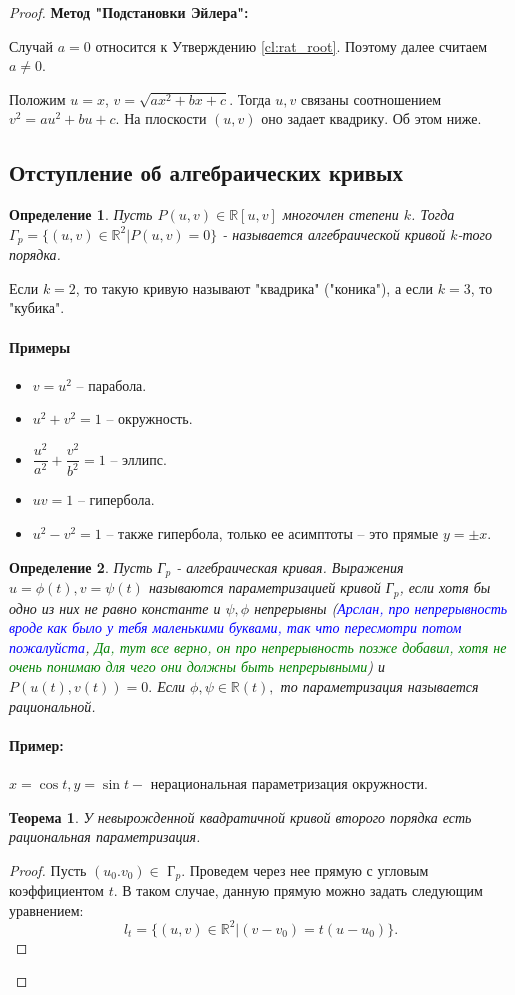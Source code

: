 \documentclass{article}
\theoremstyle{plain}
\newtheorem{theorem}{Теорема}
\newtheorem{definition}{Определение}
\theoremstyle{definition}
\theoremstyle{remark}
\renewcommand{\*}{\cdot}
\begin{document}
\begin{proof}
\textbf{Метод "Подстановки Эйлера":}

Случай $a=0$ относится к Утверждению \ref{cl:rat_root}. Поэтому далее считаем $a\neq 0$.

Положим $u=x$, $v=\sqrt{ax^2+bx+c}$. Тогда $u, v$ связаны соотношением $v^2 = au^2+bu+c$. На плоскости $(u, v)$ оно задает квадрику. Об этом ниже.

\subsection{Отступление об алгебраических кривых}
\begin{definition}
Пусть $P(u, v) \in \mathbb{R}[u, v]$ многочлен степени $k$. Тогда $\Gamma_p = \{ (u, v) \in \mathbb{R}^2 | P(u, v)=0 \}$ - называется алгебраической кривой $k$-того порядка.
\end{definition}
Если $k=2$, то такую кривую называют "квадрика" ("коника"), а если $k=3$, то "кубика".
\paragraph{Примеры}
\begin{itemize}
    \item $v = u^2$ -- парабола.
    \item $u^2 + v^2 = 1$ -- окружность.
    \item $\dfrac{u^2}{a^2} + \dfrac{v^2}{b^2} = 1$ -- эллипс.
    \item $uv = 1$ -- гипербола.
    \item $u^2 - v^2 = 1$ -- также гипербола, только ее асимптоты -- это прямые $y = \pm x.$
\end{itemize}
\begin{definition}
Пусть Г$_p$ - алгебраическая кривая. Выражения $u = \phi(t), v = \psi(t)$ называются параметризацией кривой Г$_p$, если хотя бы одно из них не равно константе и $\psi, \phi$ непрерывны (\textcolor{blue}{Арслан, про непрерывность вроде как было у тебя маленькими буквами, так что пересмотри потом пожалуйста}, \textcolor{green}{Да, тут все верно, он про непрерывность позже добавил, хотя не очень понимаю для чего они должны быть непрерывными}) и $P(u(t), v(t)) = 0.$ Если $\phi, \psi \in \mathbb{R}(t),$ то параметризация называется рациональной.
\end{definition}
\paragraph{Пример:}
$x = \cos{t}, y = \sin{t} - $ нерациональная параметризация окружности.
\begin{theorem}
У невырожденной квадратичной кривой второго порядка есть рациональная параметризация.
\end{theorem}
\begin{proof}
Пусть $(u_0. v_0) \in$ Г$_p.$ Проведем через нее прямую с угловым коэффициентом $t$. В таком случае, данную прямую можно задать следующим уравнением: \[l_t = \{(u, v) \in \mathbb{R}^2 | (v - v_0) = t(u - u_0)\}.\] 


\end{proof}
\end{proof}
\end{document}

